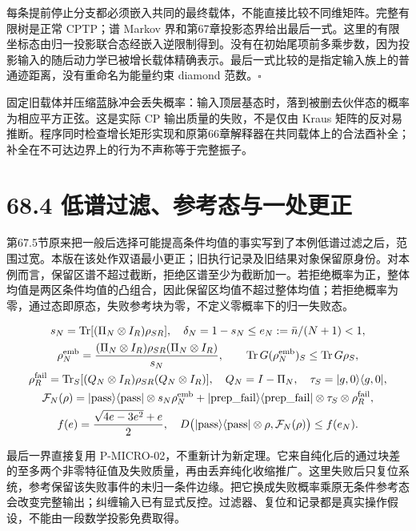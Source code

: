 \documentclass[
  11pt,
  oneside]{book}
\begin{document}
每条提前停止分支都必须嵌入共同的最终载体，不能直接比较不同维矩阵。完整有限树是正常
CPTP；谱 Markov
界和第67章投影态界给出最后一式。这里的有限坐标态由归一投影联合态经嵌入逆限制得到。没有在初始尾项前多乘步数，因为投影输入的随后动力学已被增长载体精确表示。最后一式比较的是指定输入族上的普通迹距离，没有重命名为能量约束
diamond 范数。\(\square\)

固定旧载体并压缩蓝脉冲会丢失概率：输入顶层基态时，落到被删去伙伴态的概率为相应平方正弦。这是实际
CP 输出质量的失败，不是仅由 Kraus
矩阵的反对易推断。程序同时检查增长矩形实现和原第66章解释器在共同载体上的合法酉补全；补全在不可达边界上的行为不声称等于完整振子。

\section{68.4 低谱过滤、参考态与一处更正}

第67.5节原来把一般后选择可能提高条件均值的事实写到了本例低谱过滤之后，范围过宽。本版在该处作双语最小更正；旧执行记录及旧结果对象保留原身份。对本例而言，保留区谱不超过截断，拒绝区谱至少为截断加一。若拒绝概率为正，整体均值是两区条件均值的凸组合，因此保留区均值不超过整体均值；若拒绝概率为零，通过态即原态，失败参考块为零，不定义零概率下的归一失败态。

\[
\begin{gathered}
s_N=\operatorname{Tr}[(\Pi_N\otimes I_R)\rho_{SR}],\quad
\delta_N=1-s_N\le e_N:=\bar n/(N+1)<1,\\
\rho_N^{\rm emb}=\frac{(\Pi_N\otimes I_R)\rho_{SR}(\Pi_N\otimes I_R)}{s_N},
\qquad \operatorname{Tr}G(\rho_N^{\rm emb})_S\le\operatorname{Tr}G\rho_S,\\
\rho_R^{\rm fail}=\operatorname{Tr}_S[(Q_N\otimes I_R)\rho_{SR}(Q_N\otimes I_R)],
\quad Q_N=I-\Pi_N,\quad \tau_S=|g,0\rangle\langle g,0|,\\
\mathcal F_N(\rho)=
|{\rm pass}\rangle\langle{\rm pass}|\otimes s_N\rho_N^{\rm emb}
+|{\rm prep\_\allowbreak fail}\rangle\langle{\rm prep\_\allowbreak fail}|\otimes\tau_S\otimes\rho_R^{\rm fail},\\
f(e)=\frac{\sqrt{4e-3e^2}+e}{2},\quad
D\bigl(|{\rm pass}\rangle\langle{\rm pass}|\otimes\rho,\mathcal F_N(\rho)\bigr)
\le f(e_N).
\end{gathered}
\]

最后一界直接复用
P-MICRO-02，不重新计为新定理。它来自纯化后的通过块差的至多两个非零特征值及失败质量，再由丢弃纯化收缩推广。这里失败后只复位系统，参考保留该失败事件的未归一条件边缘。把它换成失败概率乘原无条件参考态会改变完整输出；纠缠输入已有显式反控。过滤器、复位和记录都是真实操作假设，不能由一段数学投影免费取得。
\end{document}
